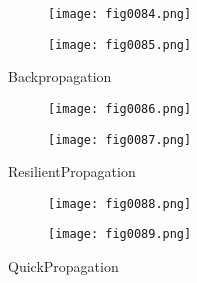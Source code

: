 %
%
%
\begin{figure}[H]
  \begin{subfigure}{0.49\textwidth}
  \texttt{[image: fig0084.png]}
  \label{fig0084}
  \end{subfigure}
  \begin{subfigure}{0.49\textwidth}
  \texttt{[image: fig0085.png]}
  \label{fig0085}
  \end{subfigure}
  \caption{Backpropagation}
\end{figure}

\begin{figure}[H]
  \begin{subfigure}{0.49\textwidth}
  \texttt{[image: fig0086.png]}
  \label{fig0086}
  \end{subfigure}
  \begin{subfigure}{0.49\textwidth}
  \texttt{[image: fig0087.png]}
  \label{fig0087}
  \end{subfigure}
  \caption{ResilientPropagation}
\end{figure}

\begin{figure}[H]
  \begin{subfigure}{0.49\textwidth}
  \texttt{[image: fig0088.png]}
  \label{fig0088}
  \end{subfigure}
  \begin{subfigure}{0.49\textwidth}
  \texttt{[image: fig0089.png]}
  \label{fig0089}
  \end{subfigure}
  \caption{QuickPropagation}
\end{figure}

